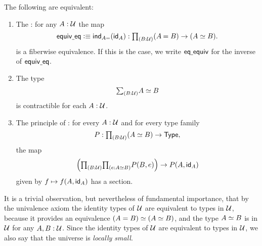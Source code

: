 \begin{prp}\label{thm:univalence}
The following are equivalent:
\begin{enumerate}
\item The : for any $A:\UU$ the map
\begin{equation*}
\equiveq\defeq \ind{A=}(\idfunc[A]) : \prd{B:\UU} (\id{A}{B})\to(\eqv{A}{B}).
\end{equation*}
is a fiberwise equivalence. If this is the case, we write
$\eqequiv$
for the inverse of $\equiveq$.
\item The type
\begin{equation*}
\sm{B:\UU}\eqv{A}{B}
\end{equation*}
is contractible for each $A:\UU$.
\item The principle of : for every $A:\UU$ and for every type family
\begin{equation*}
P:\prd{B:\UU} (\eqv{A}{B})\to \type,
\end{equation*}
the map
\begin{equation*}
\Big(\prd{B:\UU}{e:\eqv{A}{B}}P(B,e)\Big)\to P(A,\idfunc[A])
\end{equation*}
given by $f\mapsto f(A,\idfunc[A])$ has a section.\qedhere
\end{enumerate}
\end{prp}

It is a trivial observation, but nevertheless of fundamental importance, that by the univalence axiom the identity types of $\UU$ are equivalent to types in $\UU$, because it provides an equivalence $\eqv{(A=B)}{(\eqv{A}{B})}$, and the type $\eqv{A}{B}$ is in $\UU$ for any $A,B:\UU$. Since the identity types of $\UU$ are equivalent to types in $\UU$, we also say that the universe is \emph{locally small}.

